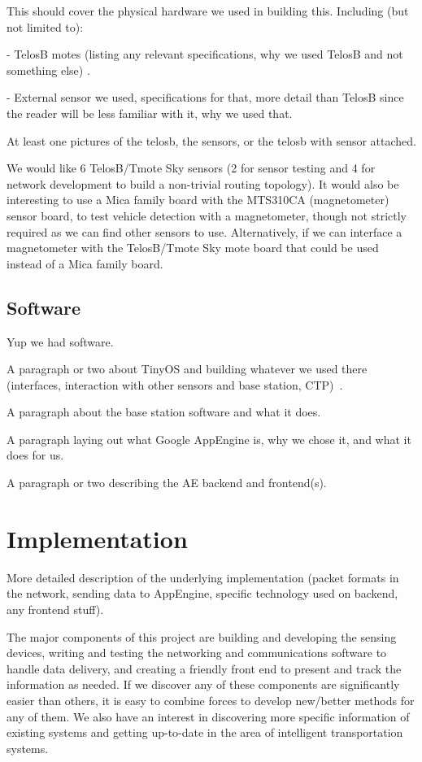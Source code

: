 \documentclass{acm_proc}
\begin{document}
This should cover the physical hardware we used in building this.
Including (but not limited to):

- TelosB motes (listing any relevant specifications, why we used TelosB
 and not something else) \cite{xbow:telosb-datasheet}.

- External sensor we used, specifications for that, more detail than
 TelosB since the reader will be less familiar with it, why we used that.

At least one pictures of the telosb, the sensors, or the telosb with sensor
attached.

We would like 6 TelosB/Tmote Sky sensors (2 for sensor testing and 4 for
network
development to build a non-trivial routing topology).
It would also be interesting to use a Mica family board with the MTS310CA
(magnetometer) sensor board, to test vehicle detection with a magnetometer,
though not strictly required as we can find other sensors to use.
Alternatively, if we can interface a magnetometer with the TelosB/Tmote Sky
mote board that could be used instead of a Mica family board.

\subsection{Software}

Yup we had software.

A paragraph or two about TinyOS and building whatever we used there
(interfaces, interaction with other sensors and base
station, CTP)~\cite{tep119:collection}.

A paragraph about the base station software and what it does.

A paragraph laying out what Google AppEngine is, why we chose it, and what
it does for us.

A paragraph or two describing the AE backend and frontend(s).

\section{Implementation}

More detailed description of the underlying implementation (packet formats
in the network, sending data to AppEngine, specific technology used on
backend, any frontend stuff).

The major components of this project are building and developing the
sensing
devices, writing and testing the networking and communications
software to handle data delivery, and creating a friendly front end to
present
and track the information as needed.
If we discover any of these components are significantly easier than
others, it
is easy to combine forces to develop new/better methods for any of them.
We also have an interest in discovering more specific information of
existing
systems and getting up-to-date in the area of intelligent transportation
systems.
\end{document}

